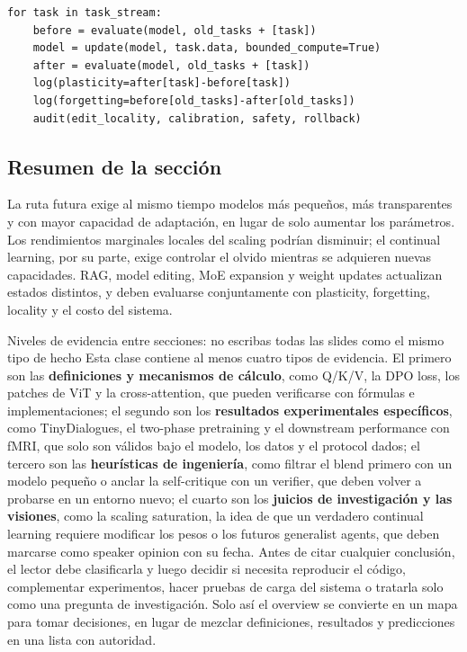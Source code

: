 \begin{lstlisting}[caption={Protocolo mínimo de continual-learning evaluation}]
for task in task_stream:
    before = evaluate(model, old_tasks + [task])
    model = update(model, task.data, bounded_compute=True)
    after = evaluate(model, old_tasks + [task])
    log(plasticity=after[task]-before[task])
    log(forgetting=before[old_tasks]-after[old_tasks])
    audit(edit_locality, calibration, safety, rollback)
\end{lstlisting}

\subsection{Resumen de la sección}

La ruta futura exige al mismo tiempo modelos más pequeños, más transparentes y con mayor capacidad de adaptación, en lugar de solo aumentar los parámetros. Los rendimientos marginales locales del scaling podrían disminuir; el continual learning, por su parte, exige controlar el olvido mientras se adquieren nuevas capacidades. RAG, model editing, MoE expansion y weight updates actualizan estados distintos, y deben evaluarse conjuntamente con plasticity, forgetting, locality y el costo del sistema.


\begin{importantbox}{Niveles de evidencia entre secciones: no escribas todas las slides como el mismo tipo de hecho}
Esta clase contiene al menos cuatro tipos de evidencia. El primero son las \textbf{definiciones y mecanismos de cálculo}, como Q/K/V, la DPO loss, los patches de ViT y la cross-attention, que pueden verificarse con fórmulas e implementaciones; el segundo son los \textbf{resultados experimentales específicos}, como TinyDialogues, el two-phase pretraining y el downstream performance con fMRI, que solo son válidos bajo el modelo, los datos y el protocol dados; el tercero son las \textbf{heurísticas de ingeniería}, como filtrar el blend primero con un modelo pequeño o anclar la self-critique con un verifier, que deben volver a probarse en un entorno nuevo; el cuarto son los \textbf{juicios de investigación y las visiones}, como la scaling saturation, la idea de que un verdadero continual learning requiere modificar los pesos o los futuros generalist agents, que deben marcarse como speaker opinion con su fecha. Antes de citar cualquier conclusión, el lector debe clasificarla y luego decidir si necesita reproducir el código, complementar experimentos, hacer pruebas de carga del sistema o tratarla solo como una pregunta de investigación. Solo así el overview se convierte en un mapa para tomar decisiones, en lugar de mezclar definiciones, resultados y predicciones en una lista con autoridad.
\end{importantbox}
